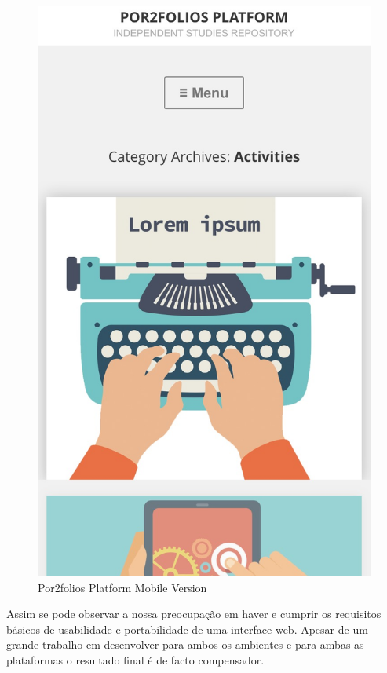 \documentclass[a4paper,12pt,journal,twoside,compsoc]{PPIEEEtran}
\begin{document}
\begin{figure}[htb]
\centering
\includegraphics[width=1\linewidth]{mobile}
\caption{Por2folios Platform Mobile Version}
\label{fig_sim}
\end{figure}

Assim se pode observar a nossa preocupação em haver e cumprir os requisitos básicos de usabilidade e portabilidade de uma interface web. Apesar de um grande trabalho em desenvolver para ambos os ambientes e para ambas as plataformas o resultado final é de facto compensador.
\end{document}
